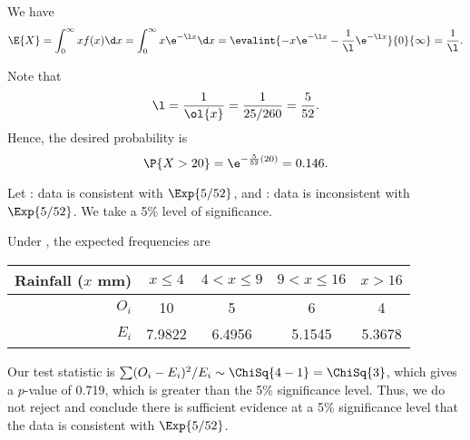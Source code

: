 \begin{solution}
    We have \[\E{X} = \int_0^\infty xf(x) \d x = \int_0^\infty x \e^{-\l x} \d x = \evalint{-x\e^{-\l x} - \frac1\l \e^{-\l x}}{0}{\infty} = \frac1\l.\]

    \begin{ppart}
        Note that \[\l = \frac1{\ol{x}} = \frac1{25/260} = \frac5{52}.\] Hence, the desired probability is \[\P{X > 20} = \e^{-\frac5{52} (20)} = 0.146.\]
    \end{ppart}
    \begin{ppart}
        Let \nullhyp: data is consistent with $\Exp{5/52}$, and \althyp: data is inconsistent with $\Exp{5/52}$. We take a 5\% level of significance.

        Under \nullhyp, the expected frequencies are
        \begin{table}[H]
            \centering
            \begin{tabular}{|r|c|c|c|c|}
            \hline
            Rainfall ($x$ mm) & $x \leq 4$ & $4 < x \leq 9$ & $9 < x \leq 16$ & $x > 16$ \\ \hline
            $O_i$ & 10 & 5 & 6 & 4 \\ \hline
            $E_i$ & 7.9822 & 6.4956 & 5.1545 & 5.3678 \\ \hline
            \end{tabular}
        \end{table}
        Our test statistic is $\sum (O_i - E_i)^2 / E_i \sim \ChiSq{4-1} = \ChiSq{3}$, which gives a $p$-value of 0.719, which is greater than the 5\% significance level. Thus, we do not reject \nullhyp{} and conclude there is sufficient evidence at a 5\% significance level that the data is consistent with $\Exp{5/52}$.
    \end{ppart}
\end{solution}

